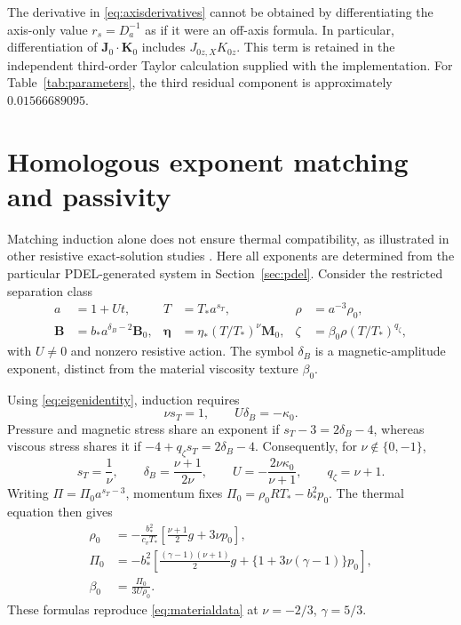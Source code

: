 \documentclass[11pt,a4paper]{article}
\theoremstyle{remark}\newtheorem{remark}{Remark}
\numberwithin{equation}{section}
\newcommand{\BB}{\boldsymbol B}
\newcommand{\JJ}{\boldsymbol J}
\newcommand{\MM}{\boldsymbol M}
\newcommand{\etab}{\boldsymbol\eta}
\begin{document}
The derivative in \eqref{eq:axisderivatives} cannot be obtained by differentiating the axis-only value $r_s=D_a^{-1}$ as if it were an off-axis formula. In particular, differentiation of $\JJ_0\cdot\boldsymbol K_0$ includes $J_{0z,X}K_{0z}$. This term is retained in the independent third-order Taylor calculation supplied with the implementation. For Table~\ref{tab:parameters}, the third residual component is approximately $0.01566689095$.

\section{Homologous exponent matching and passivity}\label{app:exponents}
Matching induction alone does not ensure thermal compatibility, as illustrated in other resistive exact-solution studies \citep{Lesaffre2007,Montani}. Here all exponents are determined from the particular PDEL-generated system in Section~\ref{sec:pdel}. Consider the restricted separation class
\begin{equation}
\begin{aligned}
a&=1+Ut,&T&=T_*a^{s_T},&
\rho&=a^{-3}\rho_0,\\
\BB&=b_*a^{\delta_B-2}\BB_0,&
\etab&=\eta_*(T/T_*)^\nu\MM_0,&
\zeta&=\beta_0\rho(T/T_*)^{q_\zeta},
\end{aligned}
\label{eq:generalansatz}
\end{equation}
with $U\ne0$ and nonzero resistive action. The symbol $\delta_B$ is a magnetic-amplitude exponent, distinct from the material viscosity texture $\beta_0$.

Using \eqref{eq:eigenidentity}, induction requires
\begin{equation}
\nu s_T=1,\qquad U\delta_B=-\kappa_0.
\label{eq:inductionmatching}
\end{equation}
Pressure and magnetic stress share an exponent if $s_T-3=2\delta_B-4$, whereas viscous stress shares it if $-4+q_\zeta s_T=2\delta_B-4$. Consequently, for $\nu\notin\{0,-1\}$,
\begin{equation}
s_T=\frac1\nu,\qquad
\delta_B=\frac{\nu+1}{2\nu},\qquad
U=-\frac{2\nu\kappa_0}{\nu+1},\qquad
q_\zeta=\nu+1.
\label{eq:matchingresult}
\end{equation}
Writing $\Pi=\Pi_0a^{s_T-3}$, momentum fixes
$\Pi_0=\rho_0RT_*-b_*^2p_0$. The thermal equation then gives
\begin{equation}
\begin{aligned}
\rho_0&=-\frac{b_*^2}{c_vT_*}
\left[\frac{\nu+1}{2}g+3\nu p_0\right],\\
\Pi_0&=-b_*^2\left[
\frac{(\gamma-1)(\nu+1)}2g+
\{1+3\nu(\gamma-1)\}p_0\right],\\
\beta_0&=\frac{\Pi_0}{3U\rho_0}.
\end{aligned}
\label{eq:generalmaterial}
\end{equation}
These formulas reproduce \eqref{eq:materialdata} at $\nu=-2/3$, $\gamma=5/3$.
\end{document}
